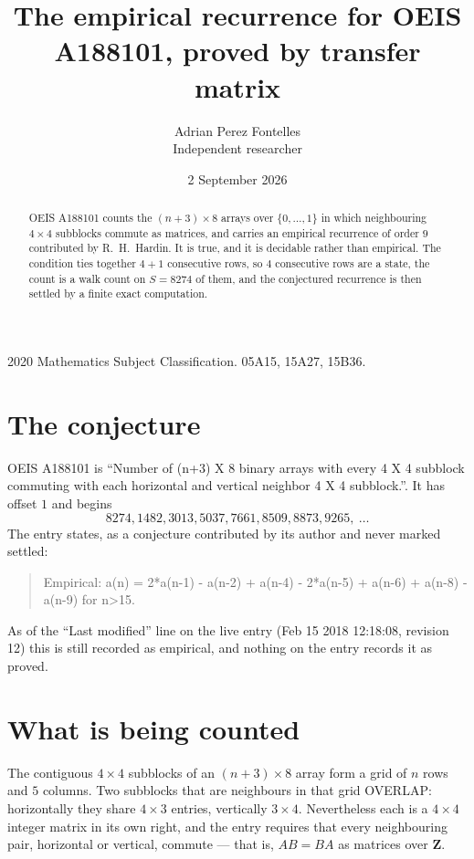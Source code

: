 \documentclass[11pt,a4paper]{article}
\title{The empirical recurrence for OEIS A188101, proved by transfer matrix}
\author{Adrian Perez Fontelles\\ \small Independent researcher}
\date{2 September 2026}
\theoremstyle{plain}
\theoremstyle{definition}
\begin{document}
\maketitle

\begin{abstract}
OEIS A188101 counts the $(n+3)\times8$ arrays over $\{0,\dots,1\}$ in which
neighbouring $4\times4$ subblocks commute as matrices, and carries an empirical
recurrence
of order $9$ contributed by R.~H.~Hardin. It is true, and it is decidable rather than
empirical. The condition ties together $4+1$ consecutive rows, so $4$ consecutive rows are
a state, the count is a walk count on $S=8274$ of them, and the conjectured recurrence is then
settled by a finite exact computation.
\end{abstract}

\noindent\small 2020 Mathematics Subject Classification. 05A15, 15A27, 15B36.\normalsize

\section{The conjecture}

OEIS A188101 is ``Number of (n+3) X 8 binary arrays with every 4 X 4 subblock commuting with each horizontal and vertical neighbor 4 X 4 subblock.''. It has offset $1$ and begins
\[
8274, 1482, 3013, 5037, 7661, 8509, 8873, 9265,\ \dots
\]
The entry states, as a conjecture contributed by its author and never marked settled:
\begin{quote}
Empirical: a(n) = 2*a(n-1) - a(n-2) + a(n-4) - 2*a(n-5) + a(n-6) + a(n-8) - a(n-9) for n>15.
\end{quote}
As of the ``Last modified'' line on the live entry (Feb 15 2018 12:18:08, revision 12) this is still
recorded as empirical, and nothing on the entry records it as proved.

\section{What is being counted}

The contiguous $4\times4$ subblocks of an $(n+3)\times8$ array form a grid of $n$
rows and $5$ columns. Two subblocks that are neighbours in that
grid OVERLAP: horizontally they share $4\times3$ entries, vertically
$3\times4$. Nevertheless each is a $4\times4$ integer matrix in its own right, and
the entry requires that every neighbouring pair, horizontal or vertical, commute --- that is,
$AB=BA$ as matrices over $\mathbf{Z}$.
\end{document}
